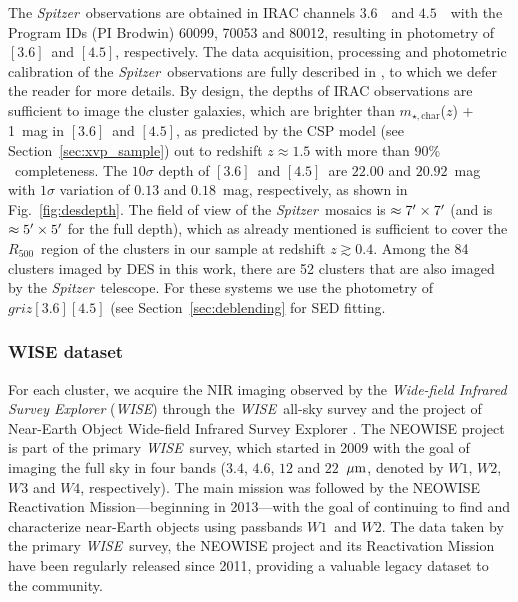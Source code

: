 \documentclass[useAMS,usenatbib,iop,numberedappendix]{mn2e}
\newcommand{\Rfiveoo}{\ensuremath{R_{500}}}
\newcommand{\redshift}{\ensuremath{z}}
\newcommand{\Spitzer}{\emph{Spitzer}}
\newcommand{\WISE}{\emph{WISE}}
\newcommand{\mstarchar}{\ensuremath{m_{\star, \mathrm{char}}}}
\newcommand{\IRACone}{\ensuremath{[3.6]}}
\newcommand{\IRACtwo}{\ensuremath{[4.5]}}
\newcommand{\Wone}{\ensuremath{W1}}
\newcommand{\Wtwo}{\ensuremath{W2}}
\newcommand{\percent}{\ensuremath{\%}}
\begin{document}
The \Spitzer\ observations are obtained in IRAC channels $3.6$~\micron\ and $4.5$~\micron\ with the Program IDs (PI Brodwin) 60099, 70053 and 80012, resulting in photometry of \IRACone\ and \IRACtwo, respectively.  The data acquisition, processing and photometric calibration of the \Spitzer\ observations are fully described in \cite{ashby13a}, to which we defer the reader for more details. 
By design, the depths of IRAC observations are sufficient to image the cluster galaxies, which are brighter than \mstarchar(\redshift) + 1~mag in \IRACone\ and \IRACtwo, as predicted by the CSP model (see Section~\ref{sec:xvp_sample}) out to redshift $\redshift\approx1.5$ with more than $90$\percent\ completeness.  The $10\sigma$ depth of \IRACone\ and \IRACtwo\ are $22.00$ and $20.92$~mag with $1\sigma$ variation of $0.13$ and $0.18$~mag, respectively, as shown in Fig.~\ref{fig:desdepth}. 
The field of view of the \Spitzer\ mosaics is $\approx7\hbox{$^\prime$}\times7\hbox{$^\prime$}$ (and is $\approx5\hbox{$^\prime$}\times5\hbox{$^\prime$}$ for the full depth), which as already mentioned is sufficient to cover the \Rfiveoo\ region of the clusters in our sample at redshift $\redshift\gtrsim0.4$.  Among the 84 clusters imaged by DES in this work, there are 52 clusters that are also imaged by the \Spitzer\ telescope.  For these systems we use the photometry of $griz\IRACone\IRACtwo$ (see Section~\ref{sec:deblending} for SED fitting.

\subsubsection{WISE dataset}
\label{sec:wise_data_sets}

For each cluster, we acquire the NIR imaging observed by the \textit{Wide-field Infrared Survey Explorer} (\WISE) through the \WISE\ all-sky survey and the project of Near-Earth Object Wide-field Infrared Survey Explorer \citep[NEOWISE;][]{mainzer14}.
The NEOWISE project is part of the primary \WISE\ survey, which started in 2009 with the goal of imaging the full sky in four bands ($3.4$, $4.6$, $12$ and $22$~$\hbox{$\mu$m}$, denoted by \Wone, \Wtwo, $W3$ and $W4$, respectively).  The main mission was followed by the NEOWISE Reactivation Mission---beginning in 2013---with the goal of continuing to find and characterize near-Earth objects using passbands \Wone\ and \Wtwo.  The data taken by the primary \WISE\ survey, the NEOWISE project and its Reactivation Mission  have been regularly released since 2011, providing a valuable legacy dataset to the community.
\end{document}
